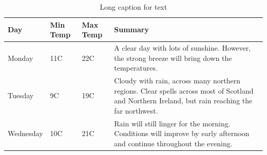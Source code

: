 \begin{table}
\begin{center}
    \begin{tabular}{ | l | l | l | p{5cm} |}
    \hline
    Day & Min Temp & Max Temp & Summary \\ \hline
    Monday & 11C & 22C & A clear day with lots of sunshine.  
    However, the strong breeze will bring down the temperatures. \\ \hline
    Tuesday & 9C & 19C & Cloudy with rain, across many northern regions. Clear spells 
    across most of Scotland and Northern Ireland, 
    but rain reaching the far northwest. \\ \hline
    Wednesday & 10C & 21C & Rain will still linger for the morning. 
    Conditions will improve by early afternoon and continue 
    throughout the evening. \\
    \hline
    \end{tabular}
    \caption[Short caption for table]{Long caption for text \label{tab:table}}
    \end{center}
\end{table}

